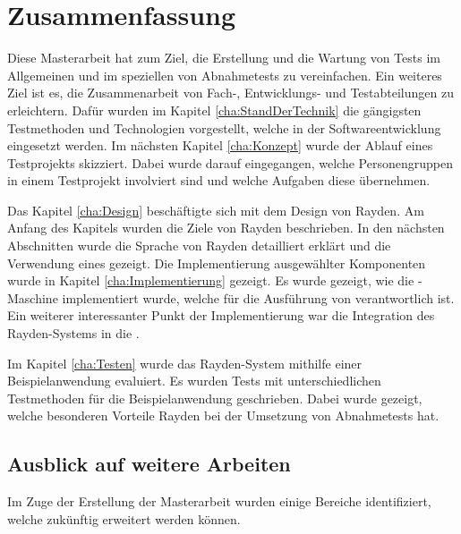 \chapter{Zusammenfassung}
\label{cha:Zusammenfassung}

Diese Masterarbeit hat zum Ziel, die Erstellung und die Wartung von Tests im Allgemeinen und im speziellen von Abnahmetests zu vereinfachen. Ein weiteres Ziel ist es, die Zusammenarbeit von Fach-, Entwicklungs- und Testabteilungen zu erleichtern. Dafür wurden im Kapitel \ref{cha:StandDerTechnik} die gängigsten Testmethoden und Technologien vorgestellt, welche in der Softwareentwicklung eingesetzt werden. Im nächsten Kapitel \ref{cha:Konzept} wurde der Ablauf eines Testprojekts skizziert. Dabei wurde darauf eingegangen, welche Personengruppen in einem Testprojekt involviert sind und welche Aufgaben diese übernehmen. 

\SuperPar
Das Kapitel \ref{cha:Design} beschäftigte sich mit dem Design von Rayden. Am Anfang des Kapitels wurden die Ziele von Rayden beschrieben. In den nächsten Abschnitten wurde die Sprache von Rayden detailliert erklärt und die Verwendung eines  gezeigt. Die Implementierung ausgewählter Komponenten wurde in Kapitel \ref{cha:Implementierung} gezeigt. Es wurde gezeigt, wie die -Maschine implementiert wurde, welche für die Ausführung von  verantwortlich ist. Ein weiterer interessanter Punkt der Implementierung war die Integration des Rayden-Systems in die . 

\SuperPar
Im Kapitel \ref{cha:Testen} wurde das Rayden-System mithilfe einer Beispielanwendung evaluiert. Es wurden Tests mit unterschiedlichen Testmethoden für die Beispielanwendung geschrieben. Dabei wurde gezeigt, welche besonderen Vorteile Rayden bei der Umsetzung von Abnahmetests hat.

\pagebreak
\section{Ausblick auf weitere Arbeiten}

Im Zuge der Erstellung der Masterarbeit wurden einige Bereiche identifiziert, welche zukünftig erweitert werden können.\\

